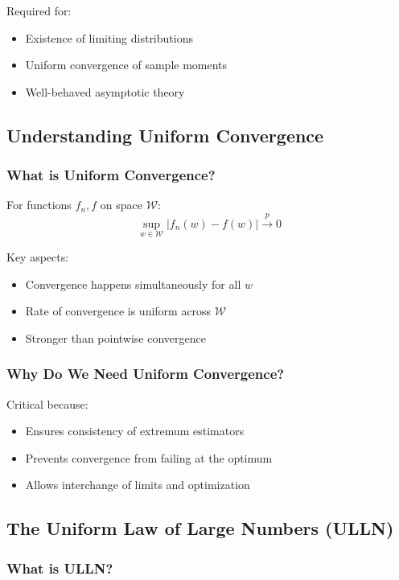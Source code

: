 \documentclass[12pt,article]{memoir}
\begin{document}
Required for:
\begin{itemize}
    \item Existence of limiting distributions
    \item Uniform convergence of sample moments
    \item Well-behaved asymptotic theory
\end{itemize}

\subsection{Understanding Uniform Convergence}

\subsubsection{What is Uniform Convergence?}

For functions $f_n, f$ on space $\mathcal{W}$:
\begin{equation}
    \sup_{w \in \mathcal{W}} |f_n(w) - f(w)| \xrightarrow{p} 0
\end{equation}

Key aspects:
\begin{itemize}
    \item Convergence happens simultaneously for all $w$
    \item Rate of convergence is uniform across $\mathcal{W}$
    \item Stronger than pointwise convergence
\end{itemize}

\subsubsection{Why Do We Need Uniform Convergence?}

Critical because:
\begin{itemize}
    \item Ensures consistency of extremum estimators
    \item Prevents convergence from failing at the optimum
    \item Allows interchange of limits and optimization
\end{itemize}

\subsection{The Uniform Law of Large Numbers (ULLN)}

\subsubsection{What is ULLN?}
\end{document}
